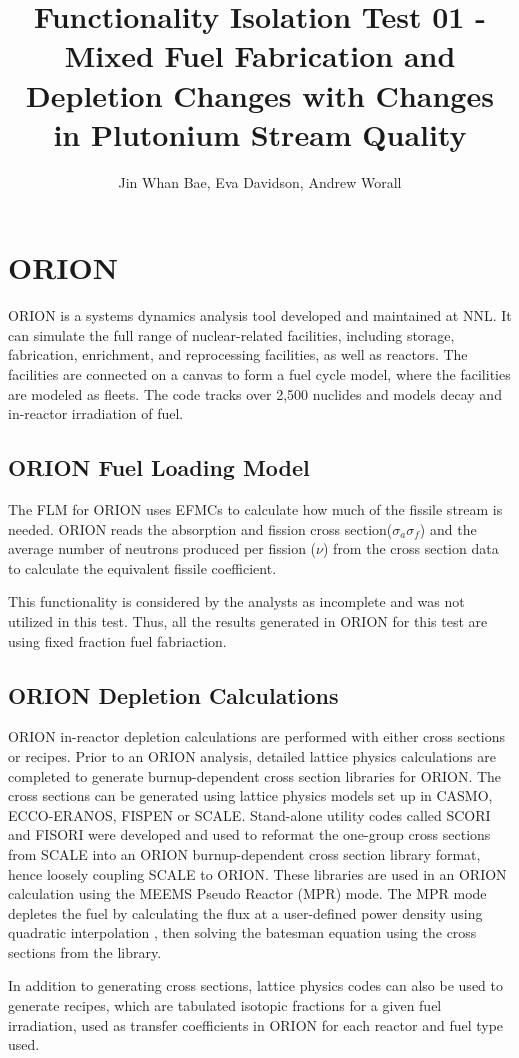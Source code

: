 \documentclass{article}
\title{Functionality Isolation Test 01 - Mixed Fuel Fabrication and Depletion Changes with
        Changes in Plutonium Stream Quality}
\author{Jin Whan Bae, Eva Davidson, Andrew Worall}
\begin{document}
\section{ORION}
ORION \cite{gregg_benefits_2013} is a systems dynamics analysis tool developed and maintained at \gls{NNL}.
It can simulate the full range of nuclear-related facilities, including storage, fabrication, enrichment,
and reprocessing facilities, as well as reactors. The facilities are connected on a canvas to form a
fuel cycle model, where the facilities are modeled as fleets. The code tracks over 2,500 nuclides
and models decay and in-reactor irradiation of fuel.

\subsection{ORION Fuel Loading Model}
The \gls{FLM} for ORION uses \glspl{EFMC} to calculate how much of the fissile stream is needed. ORION reads
the absorption and fission cross section($\sigma_a \sigma_f$) and the average number of neutrons produced per fission ($\nu$)
from the cross section data to calculate the equivalent fissile coefficient.

This functionality is considered by the analysts as incomplete and was not utilized in this test. Thus, all the results
generated in ORION for this test are using fixed fraction fuel fabriaction.

\subsection{ORION Depletion Calculations}
ORION in-reactor depletion calculations are performed with either cross sections or recipes.
Prior to an ORION analysis, detailed lattice physics calculations are completed to generate burnup-dependent
cross section libraries for ORION. The cross sections can be generated using lattice physics models set up in CASMO,
ECCO-ERANOS, FISPEN or SCALE. Stand-alone utility codes called SCORI and FISORI were developed and used to reformat
the one-group cross sections from SCALE into an ORION burnup-dependent cross section library format, hence loosely
coupling SCALE to ORION. These libraries are used in an ORION calculation using the MEEMS Pseudo Reactor (MPR) mode.
The MPR mode depletes the fuel by calculating the flux at a user-defined power density using quadratic interpolation
, then solving the batesman equation using the cross sections from the library. 

In addition to generating cross sections, lattice physics codes can also be used to generate recipes, which are
tabulated isotopic fractions for a given fuel irradiation, used as transfer coefficients in ORION for each 
reactor and fuel type used. 
\end{document}
